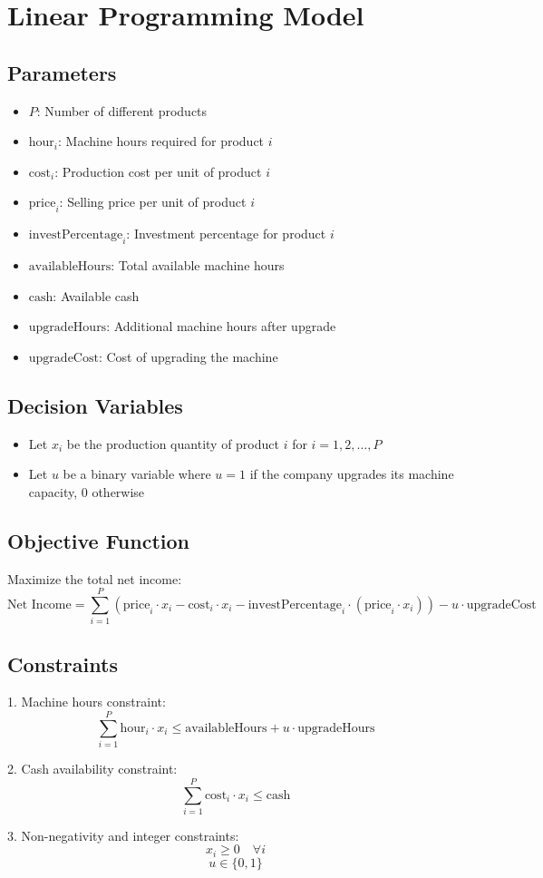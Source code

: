 \documentclass{article}
\begin{document}
\section*{Linear Programming Model}

\subsection*{Parameters}
\begin{itemize}
    \item \( P \): Number of different products
    \item \( \text{hour}_i \): Machine hours required for product \( i \)
    \item \( \text{cost}_i \): Production cost per unit of product \( i \)
    \item \( \text{price}_i \): Selling price per unit of product \( i \)
    \item \( \text{investPercentage}_i \): Investment percentage for product \( i \)
    \item \( \text{availableHours} \): Total available machine hours
    \item \( \text{cash} \): Available cash
    \item \( \text{upgradeHours} \): Additional machine hours after upgrade
    \item \( \text{upgradeCost} \): Cost of upgrading the machine
\end{itemize}

\subsection*{Decision Variables}
\begin{itemize}
    \item Let \( x_i \) be the production quantity of product \( i \) for \( i = 1, 2, \ldots, P \)
    \item Let \( u \) be a binary variable where \( u = 1 \) if the company upgrades its machine capacity, \( 0 \) otherwise
\end{itemize}

\subsection*{Objective Function}
Maximize the total net income:
\[
\text{Net Income} = \sum_{i=1}^{P} \left( \text{price}_i \cdot x_i - \text{cost}_i \cdot x_i - \text{investPercentage}_i \cdot (\text{price}_i \cdot x_i) \right) - u \cdot \text{upgradeCost}
\]

\subsection*{Constraints}
1. Machine hours constraint:
\[
\sum_{i=1}^{P} \text{hour}_i \cdot x_i \leq \text{availableHours} + u \cdot \text{upgradeHours}
\]

2. Cash availability constraint:
\[
\sum_{i=1}^{P} \text{cost}_i \cdot x_i \leq \text{cash}
\]

3. Non-negativity and integer constraints:
\[
x_i \geq 0 \quad \forall i
\]
\[
u \in \{0, 1\}
\]
\end{document}
